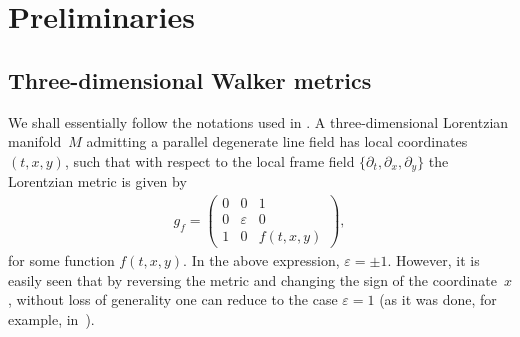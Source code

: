 \documentclass[10pt,a4paper]{amsart}
\numberwithin{equation}{section}
\begin{document}
\section{Preliminaries}\label{section2}

\subsection{Three-dimensional Walker metrics}

We shall essentially follow the notations used in \cite{ChGRVA}. A three-dimensional Lorentzian mani\-fold~$M$ admitting a parallel degenerate line f\/ield has local coordinates $(t,x,y)$, such that with respect to the local frame f\/ield
$\{ \partial_t ,\partial_x,\partial_y \}$ the Lorentzian metric is given by
\begin{gather*}
g_f =\left(
\begin{matrix}
0 & 0 & 1 \\
0 & \varepsilon & 0 \\
1 & 0 & f(t,x,y)
\end{matrix}
\right),
\end{gather*}
for some function $f(t,x,y)$. In the above expression, $\varepsilon =\pm 1$. However, it is easily seen that by reversing the metric and changing the sign of the coordinate~$x$, without loss of generality one can reduce to the case $\varepsilon=1$ (as it was done, for example, in~\cite{GGN}).
\end{document}
